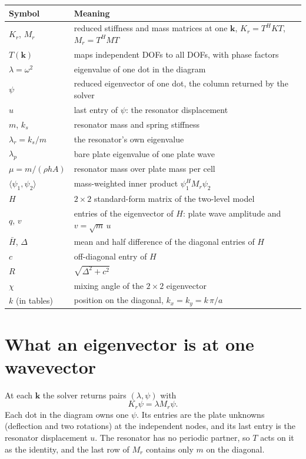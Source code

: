 \begin{center}
\begin{tabular}{|l|p{}|}
\hline
Symbol & Meaning \\
\hline
$K_r$, $M_r$ & reduced stiffness and mass matrices at one $\mathbf{k}$, $K_r = T^H K T$, $M_r = T^H M T$ \\
$T(\mathbf{k})$ & maps independent DOFs to all DOFs, with phase factors \\
$\lambda = \omega^2$ & eigenvalue of one dot in the diagram \\
$\psi$ & reduced eigenvector of one dot, the column returned by the solver \\
$u$ & last entry of $\psi$: the resonator displacement \\
$m$, $k_s$ & resonator mass and spring stiffness \\
$\lambda_r = k_s/m$ & the resonator's own eigenvalue \\
$\lambda_p$ & bare plate eigenvalue of one plate wave \\
$\mu = m/(\rho h A)$ & resonator mass over plate mass per cell \\
$\langle \psi_1, \psi_2\rangle$ & mass-weighted inner product $\psi_1^H M_r \psi_2$ \\
$H$ & $2\times 2$ standard-form matrix of the two-level model \\
$q$, $v$ & entries of the eigenvector of $H$: plate wave amplitude and $v = \sqrt{m}\,u$ \\
$\bar{H}$, $\Delta$ & mean and half difference of the diagonal entries of $H$ \\
$c$ & off-diagonal entry of $H$ \\
$R$ & $\sqrt{\Delta^2 + c^2}$ \\
$\chi$ & mixing angle of the $2\times 2$ eigenvector \\
$k$ (in tables) & position on the diagonal, $k_x = k_y = k\,\pi/a$ \\
\hline
\end{tabular}
\end{center}

\section{What an eigenvector is at one wavevector}

At each $\mathbf{k}$ the solver returns pairs $(\lambda, \psi)$ with
\begin{equation}
  K_r \psi = \lambda M_r \psi .
\end{equation}
Each dot in the diagram owns one $\psi$. Its entries are the plate unknowns
(deflection and two rotations) at the independent nodes, and its last entry is the
resonator displacement $u$. The resonator has no periodic partner, so $T$ acts on it
as the identity, and the last row of $M_r$ contains only $m$ on the diagonal.

